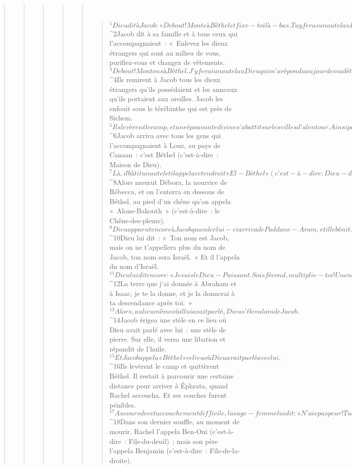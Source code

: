 \begin{verse}
\begin{verse}
\begin{verse}
\begin{verse}
\begin{verse}
         
      \bchapter{}
      \begin{verse}
${}^{1}Dieu dit à Jacob : « Debout ! Monte à Béthel et fixe-toi là-bas. Tu y feras un autel au Dieu qui t’est apparu lorsque tu fuyais devant ton frère Ésaü. » 
${}^{2}Jacob dit à sa famille et à tous ceux qui l’accompagnaient : « Enlevez les dieux étrangers qui sont au milieu de vous, purifiez-vous et changez de vêtements. 
${}^{3}Debout ! Montons à Béthel. J’y ferai un autel au Dieu qui m’a répondu au jour de ma détresse, qui a été avec moi sur le chemin où je marchais. » 
${}^{4}Ils remirent à Jacob tous les dieux étrangers qu’ils possédaient et les anneaux qu’ils portaient aux oreilles. Jacob les enfouit sous le térébinthe qui est près de Sichem. 
${}^{5}Ils levèrent le camp, et une épouvante divine s’abattit sur les villes d’alentour. Ainsi personne ne poursuivit les fils de Jacob.
${}^{6}Jacob arriva avec tous les gens qui l’accompagnaient à Louz, au pays de Canaan : c’est Béthel (c’est-à-dire : Maison de Dieu). 
${}^{7}Là, il bâtit un autel et il appela cet endroit « El-Béthel » (c’est-à-dire : Dieu-de-Béthel). Car c’est là que Dieu s’était révélé à lui quand il fuyait devant son frère. 
${}^{8}Alors mourut Débora, la nourrice de Rébecca, et on l’enterra en dessous de Béthel, au pied d’un chêne qu’on appela « Alone-Bakouth » (c’est-à-dire : le Chêne-des-pleurs).
${}^{9}Dieu apparut encore à Jacob quand celui-ci arriva de Paddane-Aram, et il le bénit. 
${}^{10}Dieu lui dit : « Ton nom est Jacob, mais on ne t’appellera plus du nom de Jacob, ton nom sera Israël. » Et il l’appela du nom d’Israël.
${}^{11}Dieu lui dit encore : « Je suis le Dieu-Puissant. Sois fécond, multiplie-toi ! Une nation – et même une assemblée de nations – sera issue de toi, des rois sortiront de toi. 
${}^{12}La terre que j’ai donnée à Abraham et à Isaac, je te la donne, et je la donnerai à ta descendance après toi. »
${}^{13}Alors, au lieu même où il lui avait parlé, Dieu s’éleva loin de Jacob.
${}^{14}Jacob érigea une stèle en ce lieu où Dieu avait parlé avec lui : une stèle de pierre. Sur elle, il versa une libation et répandit de l’huile. 
${}^{15}Et Jacob appela « Béthel » ce lieu où Dieu avait parlé avec lui.
${}^{16}Ils levèrent le camp et quittèrent Béthel. Il restait à parcourir une certaine distance pour arriver à Éphrata, quand Rachel accoucha. Et ses couches furent pénibles. 
${}^{17}Au cours de cet accouchement difficile, la sage-femme lui dit : « N’aie pas peur ! Tu as encore un fils ! » 
${}^{18}Dans son dernier souffle, au moment de mourir, Rachel l’appela Ben-Oni (c’est-à-dire : Fils-du-deuil) ; mais son père l’appela Benjamin (c’est-à-dire : Fils-de-la-droite). 

\end{verse}
\end{verse}
\end{verse}
\end{verse}
\end{verse}
\end{verse}
